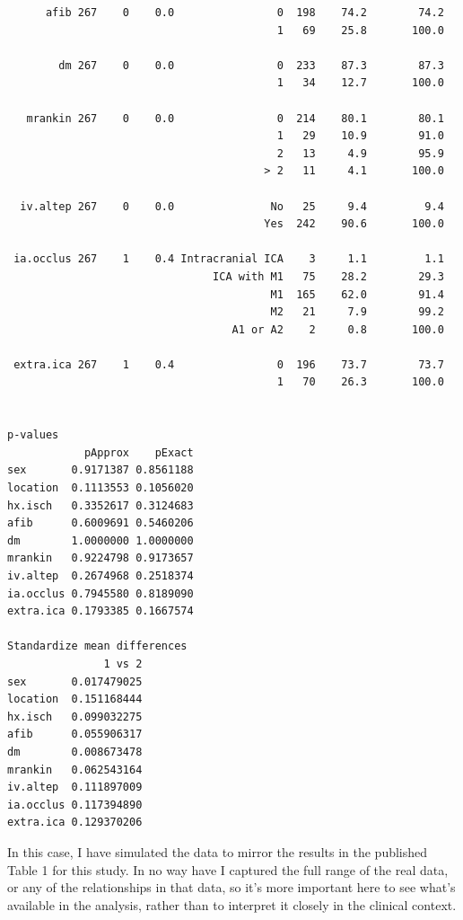 \documentclass[]{book}
\theoremstyle{definition}
\theoremstyle{definition}
\theoremstyle{definition}
\theoremstyle{remark}
\begin{document}
\begin{verbatim}
      afib 267    0    0.0                0  198    74.2        74.2
                                          1   69    25.8       100.0
                                                                    
        dm 267    0    0.0                0  233    87.3        87.3
                                          1   34    12.7       100.0
                                                                    
   mrankin 267    0    0.0                0  214    80.1        80.1
                                          1   29    10.9        91.0
                                          2   13     4.9        95.9
                                        > 2   11     4.1       100.0
                                                                    
  iv.altep 267    0    0.0               No   25     9.4         9.4
                                        Yes  242    90.6       100.0
                                                                    
 ia.occlus 267    1    0.4 Intracranial ICA    3     1.1         1.1
                                ICA with M1   75    28.2        29.3
                                         M1  165    62.0        91.4
                                         M2   21     7.9        99.2
                                   A1 or A2    2     0.8       100.0
                                                                    
 extra.ica 267    1    0.4                0  196    73.7        73.7
                                          1   70    26.3       100.0
                                                                    

p-values
            pApprox    pExact
sex       0.9171387 0.8561188
location  0.1113553 0.1056020
hx.isch   0.3352617 0.3124683
afib      0.6009691 0.5460206
dm        1.0000000 1.0000000
mrankin   0.9224798 0.9173657
iv.altep  0.2674968 0.2518374
ia.occlus 0.7945580 0.8189090
extra.ica 0.1793385 0.1667574

Standardize mean differences
               1 vs 2
sex       0.017479025
location  0.151168444
hx.isch   0.099032275
afib      0.055906317
dm        0.008673478
mrankin   0.062543164
iv.altep  0.111897009
ia.occlus 0.117394890
extra.ica 0.129370206
\end{verbatim}

In this case, I have simulated the data to mirror the results in the
published Table 1 for this study. In no way have I captured the full
range of the real data, or any of the relationships in that data, so
it's more important here to see what's available in the analysis, rather
than to interpret it closely in the clinical context.
\end{document}
